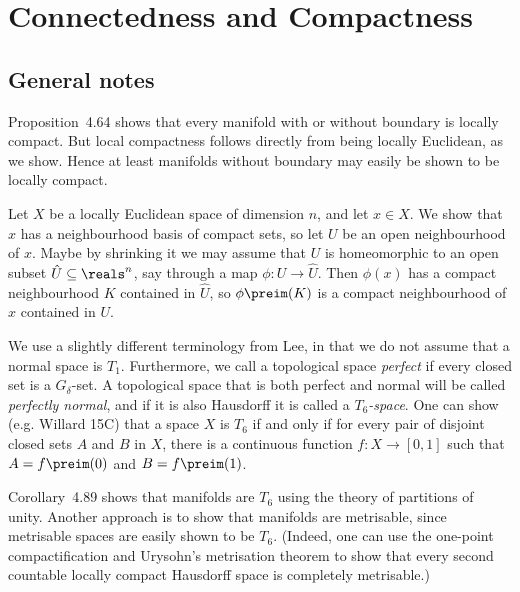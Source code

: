 \documentclass[article, a4paper, 11pt, oneside]{memoir}
\numberwithin{equation}{chapter}
\theoremstyle{nonumberplain}
\begin{document}
\chapter{Connectedness and Compactness}

\section*{General notes}

\begin{remarkbreak}
    Proposition~4.64 shows that every manifold with or without boundary is locally compact. But local compactness follows directly from being locally Euclidean, as we show. Hence at least manifolds without boundary may easily be shown to be locally compact.

    Let $X$ be a locally Euclidean space of dimension $n$, and let $x \in X$. We show that $x$ has a neighbourhood basis of compact sets, so let $U$ be an open neighbourhood of $x$. Maybe by shrinking it we may assume that $U$ is homeomorphic to an open subset $\hat{U} \subseteq \reals^n$, say through a map $\phi \colon U \to \hat{U}$. Then $\phi(x)$ has a compact neighbourhood $K$ contained in $\hat{U}$, so $\phi\preim(K)$ is a compact neighbourhood of $x$ contained in $U$.
\end{remarkbreak}


\begin{remarkbreak}
    We use a slightly different terminology from Lee, in that we do not assume that a normal space is $T_1$. Furthermore, we call a topological space \emph{perfect} if every closed set is a $G_\delta$-set. A topological space that is both perfect and normal will be called \emph{perfectly normal}, and if it is also Hausdorff it is called a \emph{$T_6$-space}. One can show (e.g. Willard 15C) that a space $X$ is $T_6$ if and only if for every pair of disjoint closed sets $A$ and $B$ in $X$, there is a continuous function $f \colon X \to [0,1]$ such that $A = f\preim(0)$ and $B = f\preim(1)$.
    
    Corollary~4.89 shows that manifolds are $T_6$ using the theory of partitions of unity. Another approach is to show that manifolds are metrisable, since metrisable spaces are easily shown to be $T_6$. (Indeed, one can use the one-point compactification and Urysohn's metrisation theorem to show that every second countable locally compact Hausdorff space is completely metrisable.)
\end{remarkbreak}
\end{document}
